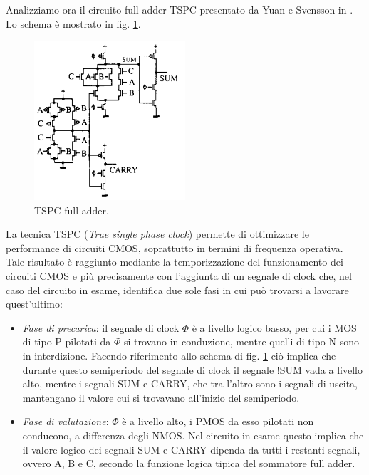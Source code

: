 Analizziamo ora il circuito full adder TSPC presentato da Yuan e Svensson in \cite{yuan1989high}. Lo schema è mostrato in fig. \ref{fig:fig_schemaDaArticolo}.

\begin{figure}[hbt!]
	\centering
	\includegraphics[width=0.5\textwidth]{figure/SchemaFullAdderTSPC_DaArticolo.PNG}
	\caption{TSPC full adder.}
	\label{fig:fig_schemaDaArticolo}
\end{figure}

La tecnica TSPC (\textit{True single phase clock}) permette di ottimizzare le performance di circuiti CMOS, soprattutto in termini di frequenza operativa. Tale risultato è raggiunto mediante la temporizzazione del funzionamento dei circuiti CMOS e più precisamente con l'aggiunta di un segnale di clock che, nel caso del circuito in esame, identifica due sole fasi in cui può trovarsi a lavorare quest'ultimo:

\begin{itemize}
	\item \textit{Fase di precarica}: il segnale di clock $\Phi$ è a livello logico basso, per cui i MOS di tipo P pilotati da $\Phi$ si trovano in conduzione, mentre quelli di tipo N sono in interdizione. Facendo riferimento allo schema di fig.  \ref{fig:fig_schemaDaArticolo} ciò implica che durante questo semiperiodo del segnale di clock il segnale !SUM vada a livello alto, mentre i segnali SUM e CARRY, che tra l'altro sono i segnali di uscita, mantengano il valore cui si trovavano all'inizio del semiperiodo. 
	\item \textit{Fase di valutazione}: $\Phi$ è a livello alto, i PMOS da esso pilotati non conducono, a differenza degli NMOS. Nel circuito in esame questo implica che il valore logico dei segnali SUM e CARRY dipenda da tutti i restanti segnali, ovvero A, B e C, secondo la funzione logica tipica del sommatore full adder.
\end{itemize}


